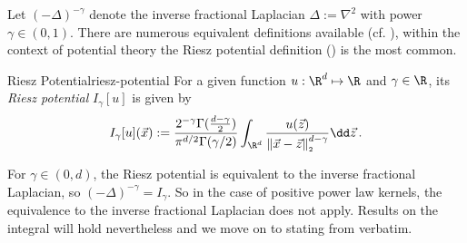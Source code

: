 Let $(-\Delta)^{-\gamma}$ denote the inverse fractional Laplacian $\Delta := \nabla^2$ with power $\gamma \in (0, 1)$.
There are numerous equivalent definitions available (cf. \cite{2015-fractional-laplacian-definitions}), within the context of potential theory the Riesz potential definition () is the most common.

\begin{definition}{Riesz Potential}{riesz-potential}
  For a given function $u: \R^d \mapsto \R$ and $\gamma \in \R$, its \textit{Riesz potential} $I_{\gamma}[u]$ is given by
  $$I_{\gamma}[u](\vec{x}) := \frac{2^{-\gamma} \Gamma(\tfrac{d-\gamma}{2})}{\pi^{d/2} \Gamma(\gamma/2)} \int_{\R^d} \frac{u(\vec{z})}{\norm{\vec{x}-\vec{z}}^{d-\gamma}} \dd\vec{z}\,.$$
\end{definition}

For $\gamma \in (0, d)$, the Riesz potential is equivalent to the inverse fractional Laplacian, so $(-\Delta)^{-\gamma} = I_\gamma$.
So in the case of positive power law kernels, the equivalence to the inverse fractional Laplacian does not apply.
Results on the integral will hold nevertheless and we move on to stating  from \cite{2021-arbitrary-dimensions} verbatim.
